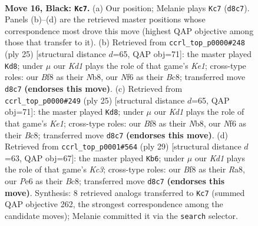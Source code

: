 \documentclass[11pt]{article}
\begin{document}
\clearpage

\begin{figure}[p]\centering
\begin{subfigure}{0.46\textwidth}\centering
\resizebox{\linewidth}{!}{%
\newchessgame
\chessboard[
  setfen={r1bk1b1r/5Npp/2p1pn2/p1P5/5P1P/4P3/PP6/RNB3K1 b - - 0 16},
  showmover=false,
  pgfstyle=straightmove, color=movearrow, markmove={d8-c7}
]}
\caption{}
\end{subfigure}\hfill
\begin{subfigure}{0.46\textwidth}\centering
\resizebox{\linewidth}{!}{%
\newchessgame
\chessboard[
  setfen={rnb1kb1r/ppN2ppp/8/4P3/4P3/8/PP2K1PP/R1B2BNn b kq - 1 13},
  showmover=false,
  pgfstyle=straightmove, color=movearrow, markmove={e8-d8}
]}
\caption{}
\end{subfigure}
\\[4pt]
\begin{subfigure}{0.46\textwidth}\centering
\resizebox{\linewidth}{!}{%
\newchessgame
\chessboard[
  setfen={rnb1kb1r/ppN2ppp/8/4P3/4P3/8/PP2K1PP/R1B2BNn b kq - 1 13},
  showmover=false,
  pgfstyle=straightmove, color=movearrow, markmove={e8-d8}
]}
\caption{}
\end{subfigure}\hfill
\begin{subfigure}{0.46\textwidth}\centering
\resizebox{\linewidth}{!}{%
\newchessgame
\chessboard[
  setfen={r1b2b1r/1p3p1p/2k2p2/pp6/3N1B2/2P5/PP3PPP/R3K2R b KQ - 1 15},
  showmover=false,
  pgfstyle=straightmove, color=movearrow, markmove={c6-b6}
]}
\caption{}
\end{subfigure}
\caption{\textbf{Move 16, Black: \texttt{Kc7}.} (a) Our position; Melanie plays \texttt{Kc7} (\texttt{d8c7}). Panels (b)--(d) are the retrieved master positions whose correspondence most drove this move (highest QAP objective among those that transfer to it). (b) Retrieved from \texttt{ccrl\_top\_p0000\#248} (ply 25) [structural distance $d$=65, QAP obj=71]: the master played \texttt{Kd8}; under $\mu$ our \emph{Kd1} plays the role of that game's \emph{Ke1}; cross-type roles: our \emph{B}f8 as their \emph{N}b8, our \emph{N}f6 as their \emph{B}c8; transferred move \texttt{d8c7} \textbf{(endorses this move)}. (c) Retrieved from \texttt{ccrl\_top\_p0000\#249} (ply 25) [structural distance $d$=65, QAP obj=71]: the master played \texttt{Kd8}; under $\mu$ our \emph{Kd1} plays the role of that game's \emph{Ke1}; cross-type roles: our \emph{B}f8 as their \emph{N}b8, our \emph{N}f6 as their \emph{B}c8; transferred move \texttt{d8c7} \textbf{(endorses this move)}. (d) Retrieved from \texttt{ccrl\_top\_p0001\#564} (ply 29) [structural distance $d$=63, QAP obj=67]: the master played \texttt{Kb6}; under $\mu$ our \emph{Kd1} plays the role of that game's \emph{Kc3}; cross-type roles: our \emph{B}f8 as their \emph{R}a8, our \emph{P}e6 as their \emph{B}c8; transferred move \texttt{d8c7} \textbf{(endorses this move)}. Synthesis: 8 retrieved analogs transferred to \texttt{Kc7} (summed QAP objective 262, the strongest correspondence among the candidate moves); Melanie committed it via the \texttt{search} selector.}
\label{fig:thought-m31}
\end{figure}
\end{document}
